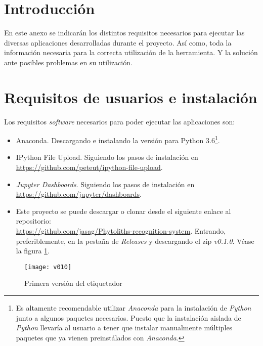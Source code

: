 \label{manuser}
\section{Introducción}

En este anexo se indicarán los distintos requisitos necesarios para ejecutar las diversas aplicaciones desarrolladas durante el proyecto. Así como, toda la información necesaria para la correcta utilización de la herramienta. Y la solución ante posibles problemas en su utilización.

\section{Requisitos de usuarios e instalación}

Los requisitos \textit{software} necesarios para poder ejecutar las aplicaciones son:

\begin{itemize}
	\item Anaconda. Descargando e instalando la versión para Python 3.6\footnote{Es altamente recomendable utilizar \textit{Anaconda} para la instalación de \textit{Python} junto a algunos paquetes necesarios. Puesto que la instalación aislada de \textit{Python} llevaría al usuario a tener que instalar manualmente múltiples paquetes que ya vienen preinstálados con \textit{Anaconda}.}.

	\item IPython File Upload. Siguiendo los pasos de instalación en \url{https://github.com/peteut/ipython-file-upload}.

	\item \textit{Jupyter Dashboards}. Siguiendo los pasos de instalación en \url{https://github.com/jupyter/dashboards}.

	\item Este proyecto se puede descargar o clonar desde el siguiente enlace al repositorio:\\ \url{https://github.com/jasag/Phytoliths-recognition-system}. Entrando, preferiblemente, en la pestaña de \textit{Releases} y descargando el zip \textit{v0.1.0}. Véase la figura \ref{fig:E.4.0}.

\end{itemize}

\begin{figure}[h]
\centering
\texttt{[image: v010]}
\caption{Primera versión del etiquetador}
\label{fig:E.4.0}
\end{figure}

